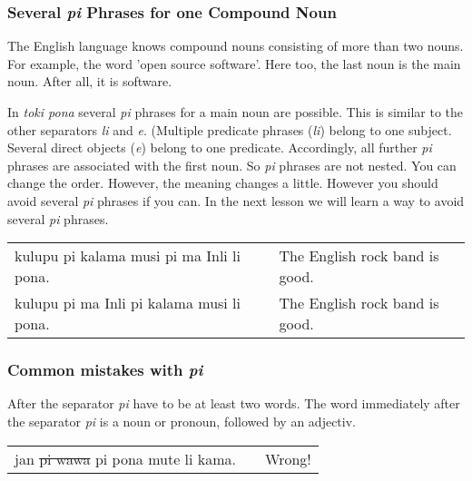 %
\subsubsection*{Several \textit{pi} Phrases for one Compound Noun} 
%

The English language knows compound nouns consisting of more than two nouns. 
For example, the word 'open source software'.  
Here too, the last noun is the main noun. 
After all, it is software. 

In \textit{toki pona} several \textit{pi} phrases for a main noun are possible. 
This is similar to the other separators \textit{li} and \textit{e}. 
(Multiple predicate phrases (\textit{li}) belong to one subject. 
Several direct objects (\textit{e}) belong to one predicate.
Accordingly, all further \textit{pi} phrases are associated with the first noun. 
So \textit{pi} phrases are not nested. 
You can change the order. 
However, the meaning changes a little. 
However you should avoid several \textit{pi} phrases if you can. 
In the next lesson we will learn a way to avoid several \textit{pi} phrases.

\begin{supertabular}{p{5,5cm}|ll}
kulupu pi kalama musi pi ma Inli li pona. &&  The English rock band is good. \\ 
kulupu pi ma Inli pi kalama musi li pona. &&  The English rock band is good. \\ 
\end{supertabular}

% 
\newpage
%
\subsubsection*{Common mistakes with \textit{pi}}
\label{'mistakes_with_pi'}
%

After the separator \textit{pi} have to be at least two words. 
The word immediately after the separator \textit{pi} is a noun or pronoun, followed by an adjectiv.

\begin{supertabular}{p{5,5cm}|ll}
jan \sout{pi wawa} pi pona mute li kama. && Wrong! \\ %
\end{supertabular}

